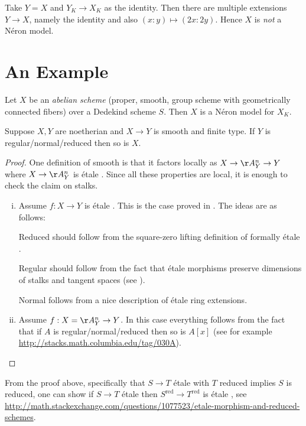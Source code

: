 \documentclass[11pt]{article}
\newcommand{\neron}{N\'{e}ron }
\newcommand{\etale}{\'{e}tale }
\begin{document}
Take $Y = X$ and $Y_K \to X_K$ as the identity. Then there are multiple extensions $Y \to X$, namely the identity and also $(x:y) \mapsto (2x:2y)$. Hence $X$ is \emph{not} a \neron model.

\section{An Example}

\begin{prop}\label{asareneronmodel}
	Let $X$ be an \emph{abelian scheme} (proper, smooth, group scheme with geometrically connected fibers) over a Dedekind scheme $S$. Then $X$ is a \neron model for $X_K$.
\end{prop}

\begin{lem}\label{smoothoverregnormred}
	Suppose $X,Y$ are noetherian and $X \to Y$ is smooth and finite type. If $Y$ is regular/normal/reduced then so is $X$.
\end{lem}
\begin{proof}
	One definition of smooth is that it factors locally as $X \to \AA^n_Y \to Y$ where $X \to \AA^n_Y$ is \etale. Since all these properties are local, it is enough to check the claim on stalks.
	\begin{enumerate}[(i)]
		\item Assume $f:X\to Y$ is \etale. This is the case proved in \cite{milneLEC}. The ideas are as follows:
		
		Reduced should follow from the square-zero lifting definition of formally \etale.
		
		Regular should follow from the fact that \etale morphisms preserve dimensions of stalks and tangent spaces (see \cite[4.3.23]{liu2006algebraic}).
		
		Normal follows from a nice description of \etale ring extensions.
		
		\item Assume $f: X = \AA^n_Y \to Y$. In this case everything follows from the fact that if $A$ is regular/normal/reduced then so is $A[x]$ (see for example \url{http://stacks.math.columbia.edu/tag/030A}).
	\end{enumerate}
\end{proof}

\begin{rem}
	From the proof above, specifically that $S \to T$ \etale with $T$ reduced implies $S$ is reduced, one can show if $S \to T$ \etale then $S^{\text{red}} \to T^{\text{red}}$ is \etale, see \url{http://math.stackexchange.com/questions/1077523/etale-morphism-and-reduced-schemes}.
\end{rem}
\end{document}
